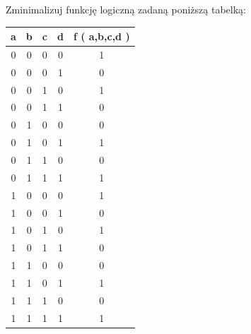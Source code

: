 \documentclass[12pt]{article}
\begin{document}
	\begin{exercise}
		Zminimalizuj funkcję logiczną zadaną poniższą tabelką:
		\begin{table}[H]
		\centering
		\begin{tabular}{|c|c|c|c|c|}
		\hline
		\textbf{a} & \textbf{b} & \textbf{c} & \textbf{d} & \textbf{f ( a,b,c,d )} \\ \hline
		0          & 0          & 0          & 0          & 1                      \\ \hline
		0          & 0          & 0          & 1          & 0                      \\ \hline
		0          & 0          & 1          & 0          & 1                      \\ \hline
		0          & 0          & 1          & 1          & 0                      \\ \hline
		0          & 1          & 0          & 0          & 0                      \\ \hline
		0          & 1          & 0          & 1          & 1                      \\ \hline
		0          & 1          & 1          & 0          & 0                      \\ \hline
		0          & 1          & 1          & 1          & 1                      \\ \hline
		1          & 0          & 0          & 0          & 1                      \\ \hline
		1          & 0          & 0          & 1          & 0                      \\ \hline
		1          & 0          & 1          & 0          & 1                      \\ \hline
		1          & 0          & 1          & 1          & 0                      \\ \hline
		1          & 1          & 0          & 0          & 0                      \\ \hline
		1          & 1          & 0          & 1          & 1                      \\ \hline
		1          & 1          & 1          & 0          & 0                      \\ \hline
		1          & 1          & 1          & 1          & 1                      \\ \hline
		\end{tabular}
		\end{table}
	\end{exercise}
\end{document}
